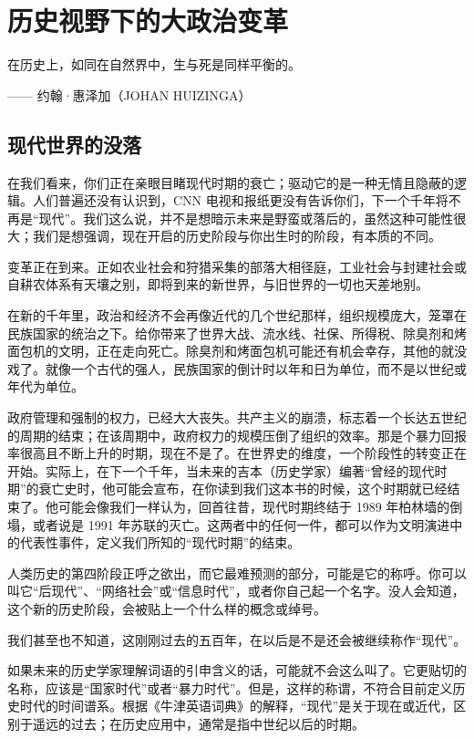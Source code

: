 \chapter[大政治变革]{历史视野下的大政治变革}

\begin{tcolorbox}
\kaishu 在历史上，如同在自然界中，生与死是同样平衡的。
\begin{flushright}
    —— 约翰·惠泽加（JOHAN HUIZINGA）
\end{flushright}
\end{tcolorbox}

\section{现代世界的没落}
在我们看来，你们正在亲眼目睹现代时期的衰亡；驱动它的是一种无情且隐蔽的逻辑。人们普遍还没有认识到，CNN 电视和报纸更没有告诉你们，下一个千年将不再是“现代”。我们这么说，并不是想暗示未来是野蛮或落后的，虽然这种可能性很大；我们是想强调，现在开启的历史阶段与你出生时的阶段，有本质的不同。

变革正在到来。正如农业社会和狩猎采集的部落大相径庭，工业社会与封建社会或自耕农体系有天壤之别，即将到来的新世界，与旧世界的一切也天差地别。

在新的千年里，政治和经济不会再像近代的几个世纪那样，组织规模庞大，笼罩在民族国家的统治之下。给你带来了世界大战、流水线、社保、所得税、除臭剂和烤面包机的文明，正在走向死亡。除臭剂和烤面包机可能还有机会幸存，其他的就没戏了。就像一个古代的强人，民族国家的倒计时以年和日为单位，而不是以世纪或年代为单位。

政府管理和强制的权力，已经大大丧失。共产主义的崩溃，标志着一个长达五世纪的周期的结束；在该周期中，政府权力的规模压倒了组织的效率。那是个暴力回报率很高且不断上升的时期，现在不是了。在世界史的维度，一个阶段性的转变正在开始。实际上，在下一个千年，当未来的吉本（历史学家）编著“曾经的现代时期”的衰亡史时，他可能会宣布，在你读到我们这本书的时候，这个时期就已经结束了。他可能会像我们一样认为，回首往昔，现代时期终结于 1989 年柏林墙的倒塌，或者说是 1991 年苏联的灭亡。这两者中的任何一件，都可以作为文明演进中的代表性事件，定义我们所知的“现代时期”的结束。

人类历史的第四阶段正呼之欲出，而它最难预测的部分，可能是它的称呼。你可以叫它“后现代”、“网络社会”或“信息时代”，或者你自己起一个名字。没人会知道，这个新的历史阶段，会被贴上一个什么样的概念或绰号。

我们甚至也不知道，这刚刚过去的五百年，在以后是不是还会被继续称作“现代”。

如果未来的历史学家理解词语的引申含义的话，可能就不会这么叫了。它更贴切的名称，应该是“国家时代”或者“暴力时代”。但是，这样的称谓，不符合目前定义历史时代的时间谱系。根据《牛津英语词典》的解释，“现代”是关于现在或近代，区别于遥远的过去；在历史应用中，通常是指中世纪以后的时期。


